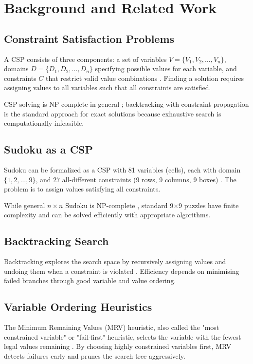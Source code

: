 \documentclass[conference]{IEEEtran}
\begin{document}
\section{Background and Related Work}

\subsection{Constraint Satisfaction Problems}

A CSP consists of three components: a set of variables $V = \{V_1, V_2, \ldots, V_n\}$, domains $D = \{D_1, D_2, \ldots, D_n\}$ specifying possible values for each variable, and constraints $C$ that restrict valid value combinations \cite{russell_norvig}. Finding a solution requires assigning values to all variables such that all constraints are satisfied.

CSP solving is NP-complete in general \cite{yato2003}; backtracking with constraint propagation is the standard approach for exact solutions because exhaustive search is computationally infeasible.

\subsection{Sudoku as a CSP}

Sudoku can be formalized as a CSP with 81 variables (cells), each with domain $\{1, 2, \ldots, 9\}$, and 27 all-different constraints (9 rows, 9 columns, 9 boxes) \cite{simonis2005}. The problem is to assign values satisfying all constraints.

While general $n \times n$ Sudoku is NP-complete \cite{yato2003}, standard 9×9 puzzles have finite complexity and can be solved efficiently with appropriate algorithms.

\subsection{Backtracking Search}

Backtracking explores the search space by recursively assigning values and undoing them when a constraint is violated \cite{russell_norvig}. Efficiency depends on minimising failed branches through good variable and value ordering.

\subsection{Variable Ordering Heuristics}

The Minimum Remaining Values (MRV) heuristic, also called the "most constrained variable" or "fail-first" heuristic, selects the variable with the fewest legal values remaining \cite{norvig2006}. By choosing highly constrained variables first, MRV detects failures early and prunes the search tree aggressively.
\end{document}
